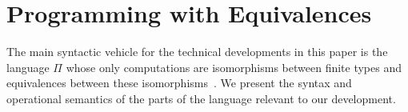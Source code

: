 \section{Programming with Equivalences} 
\label{sec:pi}

The main syntactic vehicle for the technical developments in this
paper is the language $\Pi$ whose only computations are isomorphisms
between finite types and equivalences between these
isomorphisms~\cite{James:2012:IE:2103656.2103667,Carette2016}. We
present the syntax and operational semantics of the parts of the
language relevant to our development.

